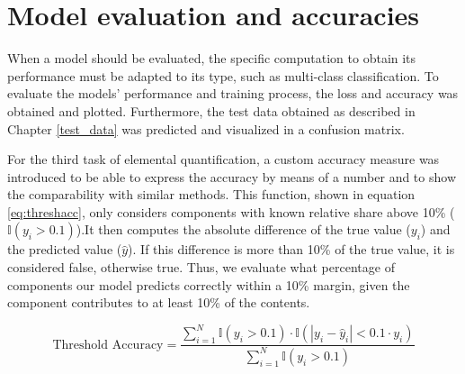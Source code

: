 

\section{Model evaluation and accuracies}

When a model should be evaluated, the specific computation to obtain its performance must be adapted to its type, such as multi-class classification. 
To evaluate the models' performance and training process, the loss and accuracy was obtained and plotted. Furthermore, the test data obtained as described in Chapter \ref{test_data} was predicted and visualized in a confusion matrix.

For the third task of elemental quantification, a custom accuracy measure was introduced to be able to express the accuracy by means of a number and to show the comparability with similar methods. This function, shown in equation \ref{eq:threshacc}, only considers components with known relative share above 10\% ($\mathbb{I}(y_i > 0.1)$).It then computes the absolute difference of the true value ($y_{i}$) and the predicted value ($\hat{y}$). If this difference is more than 10\% of the true value, it is considered false, otherwise true. Thus, we evaluate what percentage of components our model predicts correctly within a 10\% margin, given the component contributes to at least 10\% of the contents.

\begin{equation}
\label{eq:threshacc}
\text{Threshold Accuracy} = \frac{\sum_{i=1}^{N} \mathbb{I}(y_i > 0.1) \cdot \mathbb{I}(|y_i - \hat{y}_i| < 0.1 \cdot y_i)}{\sum_{i=1}^{N} \mathbb{I}(y_i > 0.1)}
\end{equation}

